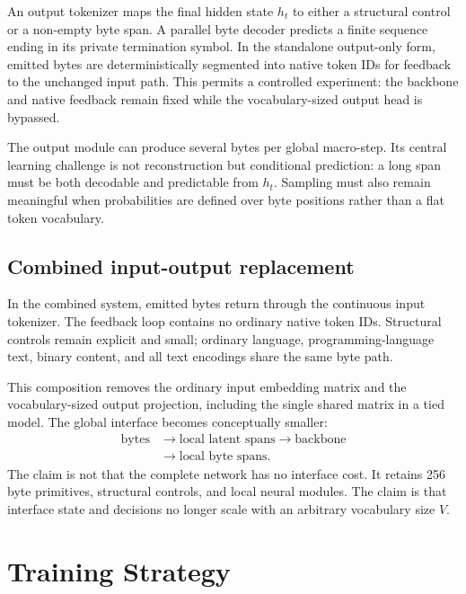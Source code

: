 \documentclass[10pt,twocolumn]{article}
\begin{document}
An output tokenizer maps the final hidden state $h_t$ to either a structural control or a non-empty
byte span. A parallel byte decoder predicts a finite sequence ending in its private termination
symbol. In the standalone output-only form, emitted bytes are deterministically segmented into
native token IDs for feedback to the unchanged input path. This permits a controlled experiment:
the backbone and native feedback remain fixed while the vocabulary-sized output head is bypassed.

The output module can produce several bytes per global macro-step. Its central learning challenge
is not reconstruction but conditional prediction: a long span must be both decodable and
predictable from $h_t$. Sampling must also remain meaningful when probabilities are defined over
byte positions rather than a flat token vocabulary.

\subsection{Combined input-output replacement}

In the combined system, emitted bytes return through the continuous input tokenizer. The feedback
loop contains no ordinary native token IDs. Structural controls remain explicit and small;
ordinary language, programming-language text, binary content, and all text encodings share the
same byte path.

This composition removes the ordinary input embedding matrix and the vocabulary-sized output
projection, including the single shared matrix in a tied model. The global interface becomes
conceptually smaller:
\begin{equation*}
\begin{aligned}
\text{bytes} &\rightarrow \text{local latent spans} \rightarrow \text{backbone}\\
&\rightarrow \text{local byte spans}.
\end{aligned}
\end{equation*}
The claim is not that the complete network has no interface cost. It retains 256 byte primitives,
structural controls, and local neural modules. The claim is that interface state and decisions no
longer scale with an arbitrary vocabulary size $V$.

\section{Training Strategy}
\end{document}
